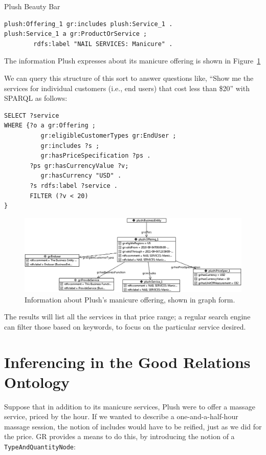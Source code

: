 \begin{example}{Plush Beauty Bar}
\begin{lstlisting}
plush:Offering_1 gr:includes plush:Service_1 .
plush:Service_1 a gr:ProductOrService ; 
        rdfs:label "NAIL SERVICES: Manicure" .
\end{lstlisting}

The information Plush expresses about its manicure offering is shown in
Figure~\ref{fig:ch14.02}

We can query this structure of this sort to answer questions like,
``Show me the services for individual customers (i.e., end users) that
cost less than \$20'' with SPARQL as follows:

\begin{lstlisting}
SELECT ?service
WHERE {?o a gr:Offering ;
          gr:eligibleCustomerTypes gr:EndUser ; 
          gr:includes ?s ;
          gr:hasPriceSpecification ?ps .
       ?ps gr:hasCurrencyValue ?v;
          gr:hasCurrency "USD" .
       ?s rdfs:label ?service .
       FILTER (?v < 20)
}
\end{lstlisting}


\begin{figure}
\centering
\includegraphics[width=5in]{media/ch14/f14-02.png}
\caption{Information about Plush's manicure offering, shown in graph form.}
\label{fig:ch14.02}
\end{figure}



The results will list all the services in that price range; a regular
search engine can filter those based on keywords, to focus on the
particular service desired.
\end{example}

\section{Inferencing in the Good Relations Ontology}

Suppose that in addition to its manicure services, Plush were to offer a
massage service, priced by the hour. If we wanted to describe a
one-and-a-half-hour massage session, the notion of includes would have
to be reified, just as we did for the price. GR provides a means to do
this, by introducing the notion of a \texttt{TypeAndQuantityNode}:

